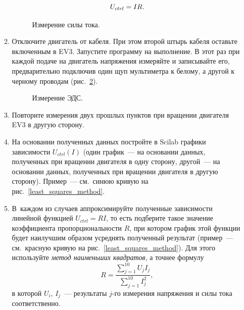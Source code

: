 \documentclass[12pt, a4paper, openany]{extarticle}
\begin{document}
\begin{enumerate}
\begin{enumerate}
\begin{equation}
	U_{ctrl} = IR\ldotp
\end{equation}
\begin{figure}[h]
	\caption{Измерение силы тока.}
	\label{sila_toka}
\end{figure}
\item \label{EiiliNaprazh}Отключите двигатель от кабеля. При этом второй штырь кабеля оставьте включенным в EV3. Запустите программу на выполнение. В этот раз при каждой подаче на двигатель напряжения измеряйте и записывайте его, предварительно подключив один щуп мультиметра к белому, а другой к черному проводам (рис.~\ref{naprazh}).

\begin{figure}[h]
	\caption{Измерение ЭДС.}
	\label{naprazh}
\end{figure}
\item Повторите измерения двух прошлых пунктов при вращении двигателя EV3 в другую сторону.
\item На основании полученных данных постройте в Scilab графики зависимости $U_{ctrl}(I)$ (один график~--- на основании данных, полученных при вращении двигателя в одну сторону, другой~--- на основании данных, полученных при вращении двигателя в другую сторону).
Пример~--- см.~синюю кривую на рис.~\ref{least_squares_method}.
\item В~каждом из случаев аппроксимируйте полученные зависимости линейной функцией $U_{ctrl} = RI$, то есть подберите такое значение коэффициента пропорциональности $R$, при котором график этой функции будет наилучшим образом усреднять полученный результат (пример~--- см.~красную кривую на рис.~\ref{least_squares_method}). Для этого используйте \textit{метод наименьших квадратов}, а точнее формулу
\begin{equation}
	R = \frac{\sum\limits_{j=1}^{10}U_jI_j}{\sum\limits_{j=1}^{10}I^2_j},
\end{equation}
в которой $U_i$, $I_j$~--- результаты $j$-го измерения напряжения и силы тока соответственно.
\begin{figure}[h]

\end{figure}
\end{enumerate}
\end{enumerate}
\end{document}
